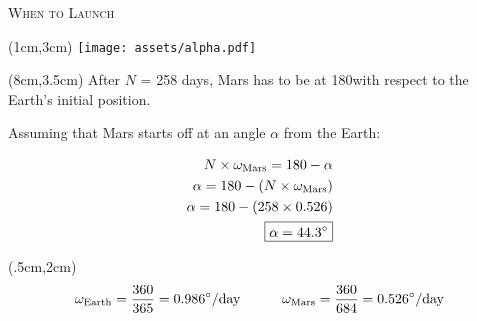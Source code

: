 \documentclass[9pt]{beamer}
\begin{document}
    \begin{frame}{\textsc{When to Launch}}
        \begin{textblock*}{5cm}(1cm,3cm)
            \centering
            \texttt{[image: assets/alpha.pdf]}
        \end{textblock*}
        
        \begin{textblock*}{4cm}(8cm,3.5cm)
            After $N$ = 258 days, Mars has to be at 180\textdegree with respect to the Earth's initial position.

            Assuming that Mars starts off at an angle $\alpha$ from the Earth:

            \centering
            \begin{align*}
                N \times \omega_{\text{Mars}} = 180-\alpha\\
                \alpha = 180 - (N \times \omega_{\text{Mars}})\\
                \alpha = 180 - (258 \times 0.526)\\
                \boxed{\alpha = 44.3\degree}
            \end{align*}

        \end{textblock*}
        
        \begin{textblock*}{12cm}(.5cm,2cm)
        \begin{equation*}
            \omega_{\text{Earth}} = \frac{360}{365} = 0.986\degree/\text{day} \hspace*{3em}  \omega_{\text{Mars}} = \frac{360}{684} = 0.526\degree/\text{day}
        \end{equation*}
        \end{textblock*}
    \end{frame}
\end{document}
